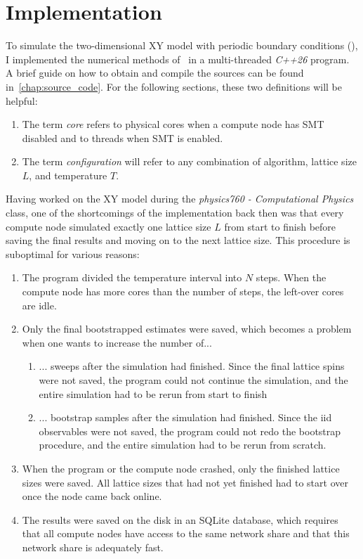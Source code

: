 \chapter{Implementation}\label{sec:impl}
	To simulate the two-dimensional XY model with periodic boundary conditions (), I implemented the numerical methods of~ in a multi-threaded \emph{C++26} program. A brief guide on how to obtain and compile the sources can be found in~\cref{chap:source_code}. For the following sections, these two definitions will be helpful:
	\begin{enumerate}
		\item The term \emph{core} refers to physical cores when a compute node has SMT disabled and to threads when SMT is enabled.
		\item The term \emph{configuration} will refer to any combination of algorithm, lattice size $L$, and temperature $T$.
	\end{enumerate}
	
	Having worked on the XY model during the \emph{physics760 - Computational Physics} class, one of the shortcomings of the implementation back then was that every compute node simulated exactly one lattice size $L$ from start to finish before saving the final results and moving on to the next lattice size. This procedure is suboptimal for various reasons:
	\begin{enumerate}
		\item \label{shortcomings:cores} The program divided the temperature interval into $N$ steps. When the compute node has more cores than the number of steps, the left-over cores are idle.
		\item Only the final bootstrapped estimates were saved, which becomes a problem when one wants to increase the number of...
		\begin{enumerate}
			\item \label{shortcomings:sweeps}  ... sweeps after the simulation had finished. Since the final lattice spins were not saved, the program could not continue the simulation, and the entire simulation had to be rerun from start to finish
			\item \label{shortcomings:bootstrap} ... bootstrap samples after the simulation had finished. Since the iid observables were not saved, the program could not redo the bootstrap procedure, and the entire simulation had to be rerun from scratch.
		\end{enumerate}
		\item \label{shortcomings:crashed} When the program or the compute node crashed, only the finished lattice sizes were saved. All lattice sizes that had not yet finished had to start over once the node came back online.
		\item \label{shortcomings:sqlite} The results were saved on the disk in an SQLite database, which requires that all compute nodes have access to the same network share and that this network share is adequately fast.
	\end{enumerate}
